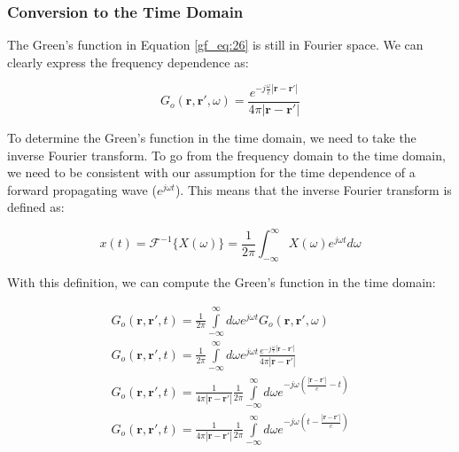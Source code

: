 \subsubsection{Conversion to the Time Domain}
The Green's function in Equation \ref{gf_eq:26} is still in Fourier space. We can clearly express the frequency dependence as:

\begin{equation}
G_o\left(\mathbf{r},\mathbf{r}',\omega\right) = \frac{e^{-j\frac{\omega}{c}|\mathbf{r} - \mathbf{r}'|}}{4\pi |\mathbf{r} - \mathbf{r}'|}
\label{gf_eq:28}
\end{equation}
\renewcommand{\baselinestretch}{2} \small\normalsize

To determine the Green's function in the time domain, we need to take the inverse Fourier transform. To go from the frequency domain to the time domain, we need to be consistent with our assumption for the time dependence of a forward propagating wave ($e^{j\omega t}$). This means that the inverse Fourier transform is defined as:

\begin{equation}
\label{gf_eq:28a}
x(t) = \mathcal{F}^{-1}\{X(\omega)\} = \frac{1}{2\pi}\int_{-\infty}^\infty X(\omega)e^{j\omega t}d\omega
\end{equation}

With this definition, we can compute the Green's function in the time domain:

\begin{equation}
\begin{gathered}
G_o\left(\mathbf{r},\mathbf{r}',t\right) = \frac{1}{2\pi}\int\limits_{-\infty}^{\infty}d\omega e^{j\omega t}G_o\left(\mathbf{r},\mathbf{r}',\omega\right) \\
G_o\left(\mathbf{r},\mathbf{r}',t\right) = \frac{1}{2\pi}\int\limits_{-\infty}^{\infty}d\omega e^{j\omega t}  \frac{e^{-j\frac{\omega}{c}|\mathbf{r}-\mathbf{r}'|}}{4\pi |\mathbf{r}-\mathbf{r}'|}\\
G_o\left(\mathbf{r},\mathbf{r}',t\right) = \frac{1}{4\pi |\mathbf{r}-\mathbf{r}'|}\frac{1}{2\pi}\int\limits_{-\infty}^{\infty}d\omega e^{-j\omega\left(\frac{|\mathbf{r}-\mathbf{r}'|}{c} - t\right)} \\
G_o\left(\mathbf{r},\mathbf{r}',t\right) = \frac{1}{4\pi |\mathbf{r}-\mathbf{r}'|}\frac{1}{2\pi}\int\limits_{-\infty}^{\infty}d\omega e^{-j\omega\left(t - \frac{|\mathbf{r}-\mathbf{r}'|}{c}\right)}
\end{gathered}
\label{gf_eq:29}
\end{equation}
\renewcommand{\baselinestretch}{2} \small\normalsize

